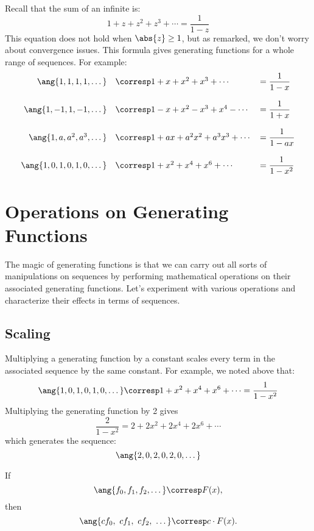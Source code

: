 Recall that the sum of an infinite  is:
%
\[
1 + z + z^2 + z^3 + \cdots = \frac{1}{1 - z}
\]
%
This equation does not hold when $\abs{z} \geq 1$, but as remarked, we
don't worry about convergence issues.  This formula gives  generating functions for a whole range of sequences.  For example:
%
\[
\begin{array}{rll}
\ang{1, 1, 1, 1, \dots}
    & \corresp 1 + x + x^2 + x^3 + \cdots
    & = \dfrac{1}{1-x} \\
\\
\ang{1, -1, 1, -1, \dots}
    & \corresp 1 - x + x^2 - x^3 + x^4 - \cdots
    &  = \dfrac{1}{1+x} \\
\\
\ang{1, a, a^2, a^3, \dots}
    & \corresp 1 + a x + a^2 x^2 + a^3 x^3 + \cdots
    &  = \dfrac{1}{1-ax} \\
\\
\ang{1, 0, 1, 0, 1, 0, \dots}
    & \corresp 1 + x^2 + x^4 + x^6 + \cdots
    & = \dfrac{1}{1 - x^2}
\end{array}
\]

\section{Operations on Generating Functions} \label{sec:gf_operations}

The magic of generating functions is that we can carry out all sorts
of manipulations on sequences by performing mathematical operations on
their associated generating functions.  Let's experiment with various
operations and characterize their effects in terms of sequences.

\subsection{Scaling}

Multiplying a generating function by a constant scales every term in
the associated sequence by the same constant.  For example, we noted
above that:
%
\[
\ang{1, 0, 1, 0, 1, 0, \dots}
    \corresp 1 + x^2 + x^4 + x^6 + \cdots = \frac{1}{1 - x^2}
\]
%
Multiplying the generating function by 2 gives
%
\[
\frac{2}{1 - x^2} = 2 + 2 x^2 + 2 x^4 + 2 x^6 + \cdots
\]
%
which generates the sequence:
%
\[
\ang{2, 0, 2, 0, 2, 0, \dots}
\]

\begin{mathrule}
\label{rule:scaling}
If
\[\ang{f_0, f_1, f_2, \dots} \corresp F(x),\]
then
%
\[
\ang{c f_0,\ c f_1,\ c f_2,\ \dots} \corresp c \cdot F(x).
\]
\end{mathrule}

